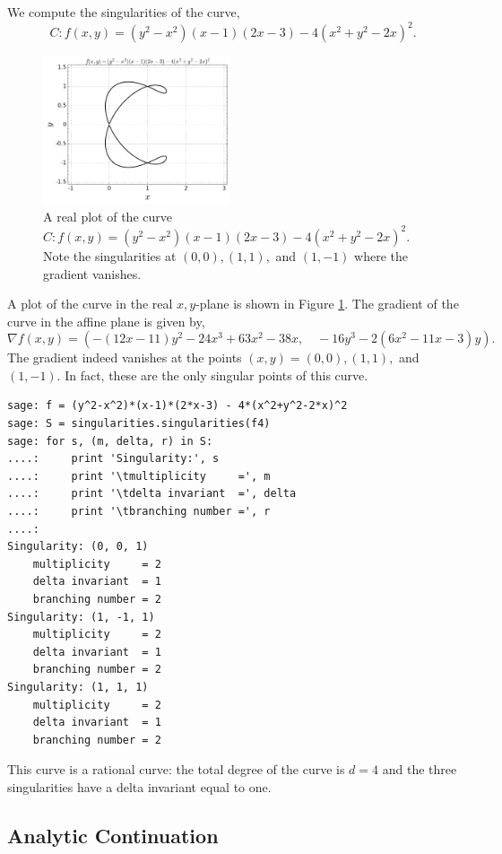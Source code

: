 \begin{example}
We compute the singularities of the curve,
\[
  C : f(x,y) = (y^2-x^2)(x-1)(2x-3) - 4(x^2+y^2-2x)^2.
\]
\begin{figure}
  \centering
  \includegraphics[width=0.49\textwidth]{images/f-singularities-example.png}
  \caption{A real plot of the curve $C: f(x,y) = (y^2-x^2)(x-1)(2x-3) -
    4(x^2+y^2-2x)^2$. Note the singularities at $(0,0), (1,1),$ and $(1,-1)$
    where the gradient vanishes.}
  \label{fig:f-singularities-example}
\end{figure}
A plot of the curve in the real $x,y$-plane is shown in Figure
\ref{fig:f-singularities-example}. The gradient of the curve in the affine plane
is given by,
\[
  \nabla f(x,y) = \left(
    -(12x-11)y^2 -24x^3 + 63x^2 - 38x, \quad
    -16y^3 - 2(6x^2 - 11x - 3)y
  \right).
\]
The gradient indeed vanishes at the points $(x,y) = (0,0), (1,1),$ and $(1,-1)$.
In fact, these are the only singular points of this curve.
\begin{lstlisting}
sage: f = (y^2-x^2)*(x-1)*(2*x-3) - 4*(x^2+y^2-2*x)^2
sage: S = singularities.singularities(f4)
sage: for s, (m, delta, r) in S:
....:     print 'Singularity:', s
....:     print '\tmultiplicity     =', m
....:     print '\tdelta invariant  =', delta
....:     print '\tbranching number =', r
....:
Singularity: (0, 0, 1)
	multiplicity     = 2
	delta invariant  = 1
	branching number = 2
Singularity: (1, -1, 1)
	multiplicity     = 2
	delta invariant  = 1
	branching number = 2
Singularity: (1, 1, 1)
	multiplicity     = 2
	delta invariant  = 1
	branching number = 2
\end{lstlisting}
This curve is a rational curve: the total degree of the curve is $d=4$ and the
three singularities have a delta invariant equal to one.
\end{example}


\subsection{Analytic Continuation} \label{subsec:background-analytic-continuation}

